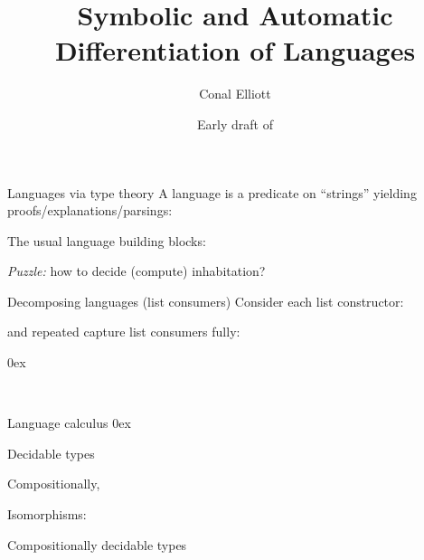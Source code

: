 \documentclass[aspectratio=169]{beamer}
\title{Symbolic and Automatic Differentiation of Languages}
\author{Conal Elliott}
\date{Early draft of \DTMnow}
\begin{document}
\begin{center}
\maketitle
{}
\end{center}

\begin{frame}{Languages via type theory}
\vspace{1.5ex}
A language is a predicate on ``strings'' yielding proofs/explanations/parsings:

The usual language building blocks:

\vspace{-3ex}

\emph{Puzzle:} how to decide (compute) inhabitation?
\end{frame}

\begin{frame}{Decomposing languages (list consumers)}
\vspace{2ex}
Consider each list constructor:
\vspace{1.5ex}

\vspace{2ex}
 and repeated  capture list consumers fully:

\vspace{-2ex}
\begin{minipage}[c]{2.8in}
\end{minipage}
\hfill
\begin{minipage}[c]{2.5in}
\mathindent0ex
\end{minipage}
\hfill\ 
\end{frame}

\begin{frame}{Language calculus}
\vspace{-1ex}
\vfill
\mathindent0ex
\end{frame}

\begin{frame}{Decidable types}
\hfill\ 
\vspace{-1.5ex}

Compositionally,


Isomorphisms:

\end{frame}

\begin{frame}{Compositionally decidable types}
\vspace{3ex}
\end{frame}


\end{document}

